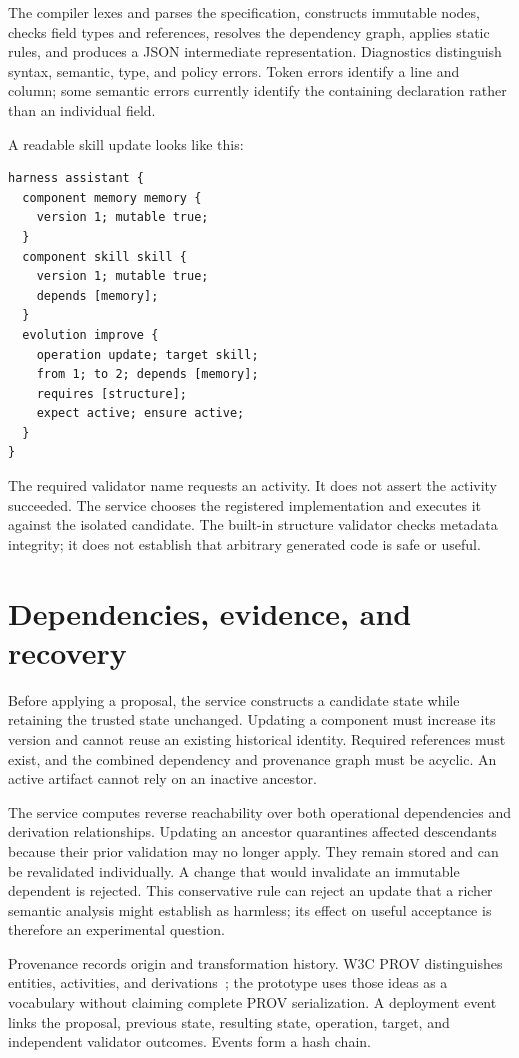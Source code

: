 \IfFileExists{IEEEcsmag.cls}{\publishertrue\documentclass{IEEEcsmag}}{\publisherfalse\documentclass[11pt]{article}}
\begin{document}
The compiler lexes and parses the specification, constructs immutable nodes, checks field types and references, resolves the dependency graph, applies static rules, and produces a JSON intermediate representation. Diagnostics distinguish syntax, semantic, type, and policy errors. Token errors identify a line and column; some semantic errors currently identify the containing declaration rather than an individual field.

A readable skill update looks like this:
\begin{verbatim}
harness assistant {
  component memory memory {
    version 1; mutable true;
  }
  component skill skill {
    version 1; mutable true;
    depends [memory];
  }
  evolution improve {
    operation update; target skill;
    from 1; to 2; depends [memory];
    requires [structure];
    expect active; ensure active;
  }
}
\end{verbatim}
The required validator name requests an activity. It does not assert the activity succeeded. The service chooses the registered implementation and executes it against the isolated candidate. The built-in structure validator checks metadata integrity; it does not establish that arbitrary generated code is safe or useful.

\section{Dependencies, evidence, and recovery}
Before applying a proposal, the service constructs a candidate state while retaining the trusted state unchanged. Updating a component must increase its version and cannot reuse an existing historical identity. Required references must exist, and the combined dependency and provenance graph must be acyclic. An active artifact cannot rely on an inactive ancestor.

The service computes reverse reachability over both operational dependencies and derivation relationships. Updating an ancestor quarantines affected descendants because their prior validation may no longer apply. They remain stored and can be revalidated individually. A change that would invalidate an immutable dependent is rejected. This conservative rule can reject an update that a richer semantic analysis might establish as harmless; its effect on useful acceptance is therefore an experimental question.

Provenance records origin and transformation history. W3C PROV distinguishes entities, activities, and derivations~\cite{prov2013}; the prototype uses those ideas as a vocabulary without claiming complete PROV serialization. A deployment event links the proposal, previous state, resulting state, operation, target, and independent validator outcomes. Events form a hash chain.
\end{document}
